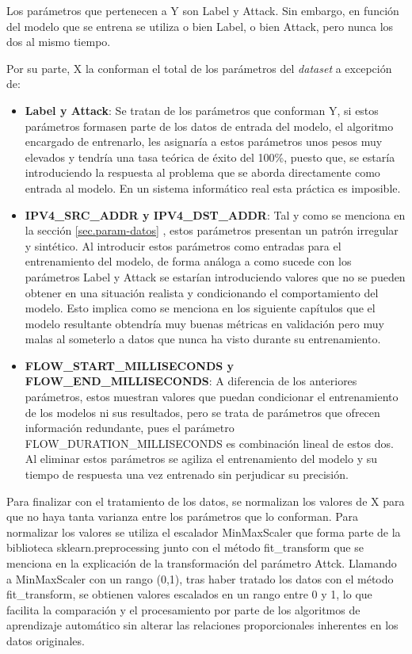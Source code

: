 Los parámetros que pertenecen a Y son Label y Attack. Sin embargo, en función del modelo que se entrena se utiliza o bien Label, o bien Attack, pero nunca los dos al mismo tiempo.

Por su parte, X la conforman el total de los parámetros del \textit{dataset} a excepción de:
\begin{itemize}
	\item \textbf{Label y Attack}: Se tratan de los parámetros que conforman Y, si estos parámetros formasen parte de los datos de entrada del modelo, el algoritmo encargado de entrenarlo, les asignaría a estos parámetros unos pesos muy elevados y tendría una tasa teórica de éxito del 100\%, puesto que, se estaría introduciendo la respuesta al problema que se aborda directamente como entrada al modelo. En un sistema informático real esta práctica es imposible.
	\item \textbf{IPV4\_SRC\_ADDR y IPV4\_DST\_ADDR}: Tal y como se menciona en la sección \ref{sec.param-datos} , estos parámetros presentan un patrón irregular y sintético. Al introducir estos parámetros como entradas para el entrenamiento del modelo, de forma análoga a como sucede con los parámetros Label y Attack se estarían introduciendo valores que no se pueden obtener en una situación realista y condicionando el comportamiento del modelo. Esto implica como se menciona en los siguiente capítulos que el modelo resultante obtendría muy buenas métricas en validación pero muy malas al someterlo a datos que nunca ha visto durante su entrenamiento.
	\item \textbf{FLOW\_START\_MILLISECONDS y FLOW\_END\_MILLISECONDS}: A diferencia de los anteriores parámetros, estos muestran valores que puedan condicionar el entrenamiento de los modelos ni sus resultados, pero se trata de parámetros que ofrecen información redundante, pues el parámetro FLOW\_DURATION\_MILLISECONDS es combinación lineal de estos dos. Al eliminar estos parámetros se agiliza el entrenamiento del modelo y su tiempo de respuesta una vez entrenado sin perjudicar su precisión.
\end{itemize}

Para finalizar con el tratamiento de los datos, se normalizan los valores de X para que no haya tanta varianza entre los parámetros que lo conforman. Para normalizar los valores se utiliza el escalador MinMaxScaler que forma parte de la biblioteca sklearn.preprocessing junto con el método fit\_transform que se menciona en la explicación de la transformación del parámetro Attck. Llamando a MinMaxScaler con un rango (0,1), tras haber tratado los datos con el método fit\_transform, se obtienen valores escalados en un rango entre 0 y 1, lo que facilita la comparación y el procesamiento por parte de los algoritmos de aprendizaje automático sin alterar las relaciones proporcionales inherentes en los datos originales.

